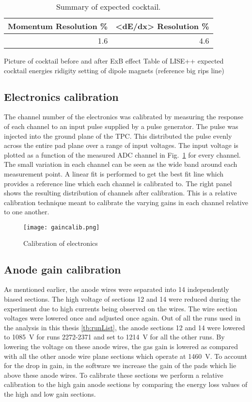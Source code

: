 \begin{table*}\centering
{}
\begin{tabular}{@{}rr@{}}\toprule
Momentum Resolution \% & <dE/dx> Resolution \% \\
\midrule
1.6  & 4.6\\
\bottomrule
\end{tabular}
\caption{Summary of expected cocktail. }
\label{tb:momresolution}
\end{table*}

Picture of cocktail before and after ExB effect
Table of LISE++ expected cocktail energies ridigity setting of dipole magnets (reference big rips line)



\subsection{Electronics calibration}
The channel number of the electronics was calibrated by measuring the response of each channel to an input pulse supplied by a pulse generator. The pulse was injected into the ground plane of the TPC. This distributed the pulse evenly across the entire pad plane over a range of input voltages. The input voltage is plotted as a function of the measured ADC channel in Fig.~\ref{fig:gaincalib} for every channel. The small variation in each channel can be seen as the wide band around each measurement point. A linear fit is performed to get the best fit line which provides a reference line which each channel is calibrated to. The right panel shows the resulting distribution of channels after calibration. This is a relative calibration technique meant to calibrate the varying gains in each channel relative to one another. 

\begin{figure}[H]
\texttt{[image: gaincalib.png]}
\caption{Calibration of electronics}
\label{fig:gaincalib}
\end{figure}

\subsection{Anode gain calibration}

As mentioned earlier, the anode wires were separated into 14 independently biased sections. The high voltage of sections 12 and 14 were reduced during the experiment due to high currents being observed on the wires. The wire section voltages were lowered once and adjusted once again. Out of all the runs used in the analysis in this thesis \ref{tb:runList}, the anode sections 12 and 14 were lowered to \SI{1085}{\volt} for runs 2272-2371 and set to \SI{1214}{\volt} for all the other runs. By lowering the voltage on these anode wires, the gas gain is lowered as compared with all the other anode wire plane sections which operate at \SI{1460}{\volt}. To account for the drop in gain, in the software we increase the gain of the pads which lie above these anode wires. To calibrate these sections we perform a relative calibration to the high gain anode sections by comparing the energy loss values of the high and low gain sections. 


